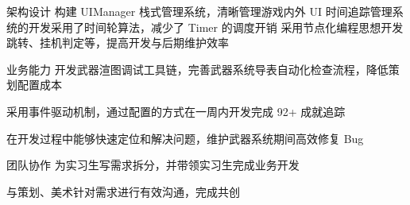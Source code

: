 

\begin{cvskills}

    \cvskill
        {架构设计} %
        {构建 ​​UIManager 栈式管理系统​​，清晰管理游戏内外 UI} %
    \cvskill
        {} %
        {时间追踪管理系统的开发采用了时间轮算法，减少了 Timer 的调度开销} %
    \cvskill
        {} %
        {采用节点化编程思想开发跳转、挂机判定等，提高开发与后期维护效率} %

    \cvskill
        {​业务能力} %
        {开发武器渲图调试工具链，完善武器系统导表自动化检查流程，降低策划配置成本} %

    \cvskill
        {} %
        {采用事件驱动机制，通过配置的方式在一周内开发完成 92+ 成就追踪} %

    \cvskill
        {} %
        {在开发过程中能够快速定位和解决问题，维护武器系统期间高效修复 Bug} %


    \cvskill
        {团队协作} %
        {为实习生写需求拆分，并带领实习生完成业务开发} %

    \cvskill
        {} %
        {与策划、美术针对需求进行有效沟通，完成共创} %


\end{cvskills}
